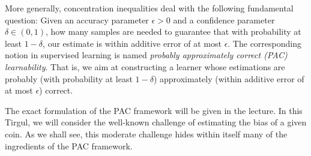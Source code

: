 \documentclass[11pt]{article}
\begin{document}
More generally, concentration inequalities deal with the following fundamental
question: Given an accuracy parameter $\epsilon > 0$ and a confidence
parameter $\delta \in (0,1)$, how many samples are needed to guarantee that with probability at least $1- \delta$, our estimate is within additive error of at most
$\epsilon$. The corresponding notion in supervised learning is named
\emph{probably approximately correct (PAC)
learnability}. That is, we aim at constructing a learner whose
estimations are probably (with probability at least $1-\delta$)
approximately (within additive error of at most $\epsilon$) correct.

The exact formulation of the PAC framework will be given in the
lecture. In this Tirgul, we will consider the well-known challenge of
estimating the bias of a given coin. As we shall see, this moderate
challenge hides within itself many of the ingredients of the PAC framework.
\end{document}
